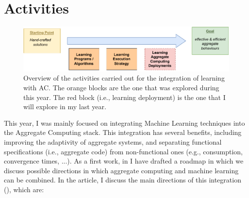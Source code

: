 \documentclass[11pt]{article}
\begin{document}
\section{Activities}
\begin{figure}
	\includegraphics[width=\textwidth]{roadmap.pdf}
	\caption{
		Overview of the activities carried out for the integration of learning with AC. 
		The orange blocks are the one that was explored during this year. 
		The red block (i.e., learning deployment) is the one that I will explore in my last year.
	}
	\label{fig:overview}
\end{figure}
This year, 
 I was mainly focused on integrating Machine Learning techniques into the Aggregate Computing stack.
%
This integration has several benefits, 
 including improving the adaptivity of aggregate systems, 
 and separating functional specifications (i.e., aggregate code) from non-functional ones (e.g., consumption, convergence times, ...).
%
As a first work, in \textit{} I have drafted 
 a roadmap in which we discuss possible directions in which 
 aggregate computing and machine learning can be combined. 
%
In the article, I discuss the main directions of this integration (), which are:
\end{document}
